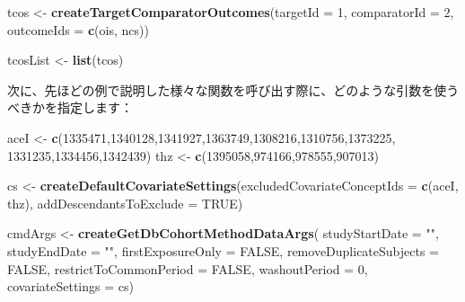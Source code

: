 \documentclass[
  11pt]{book}
\newenvironment{Shaded}{\begin{snugshade}}{\end{snugshade}}
\newcommand{\AttributeTok}[1]{\textcolor[rgb]{0.13,0.29,0.53}{#1}}
\newcommand{\ConstantTok}[1]{\textcolor[rgb]{0.56,0.35,0.01}{#1}}
\newcommand{\DecValTok}[1]{\textcolor[rgb]{0.00,0.00,0.81}{#1}}
\newcommand{\FunctionTok}[1]{\textcolor[rgb]{0.13,0.29,0.53}{\textbf{#1}}}
\newcommand{\NormalTok}[1]{#1}
\newcommand{\OtherTok}[1]{\textcolor[rgb]{0.56,0.35,0.01}{#1}}
\newcommand{\StringTok}[1]{\textcolor[rgb]{0.31,0.60,0.02}{#1}}
\theoremstyle{definition}
\theoremstyle{definition}
\theoremstyle{definition}
\theoremstyle{definition}
\theoremstyle{remark}
\begin{document}
\begin{Shaded}
\begin{Highlighting}[]
\NormalTok{tcos }\OtherTok{\textless{}{-}} \FunctionTok{createTargetComparatorOutcomes}\NormalTok{(}\AttributeTok{targetId =} \DecValTok{1}\NormalTok{,}
                                       \AttributeTok{comparatorId =} \DecValTok{2}\NormalTok{,}
                                       \AttributeTok{outcomeIds =} \FunctionTok{c}\NormalTok{(ois, ncs))}

\NormalTok{tcosList }\OtherTok{\textless{}{-}} \FunctionTok{list}\NormalTok{(tcos)}
\end{Highlighting}
\end{Shaded}

次に、先ほどの例で説明した様々な関数を呼び出す際に、どのような引数を使うべきかを指定します：

\begin{Shaded}
\begin{Highlighting}[]
\NormalTok{aceI }\OtherTok{\textless{}{-}} \FunctionTok{c}\NormalTok{(}\DecValTok{1335471}\NormalTok{,}\DecValTok{1340128}\NormalTok{,}\DecValTok{1341927}\NormalTok{,}\DecValTok{1363749}\NormalTok{,}\DecValTok{1308216}\NormalTok{,}\DecValTok{1310756}\NormalTok{,}\DecValTok{1373225}\NormalTok{,}
          \DecValTok{1331235}\NormalTok{,}\DecValTok{1334456}\NormalTok{,}\DecValTok{1342439}\NormalTok{)}
\NormalTok{thz }\OtherTok{\textless{}{-}} \FunctionTok{c}\NormalTok{(}\DecValTok{1395058}\NormalTok{,}\DecValTok{974166}\NormalTok{,}\DecValTok{978555}\NormalTok{,}\DecValTok{907013}\NormalTok{)}

\NormalTok{cs }\OtherTok{\textless{}{-}} \FunctionTok{createDefaultCovariateSettings}\NormalTok{(}\AttributeTok{excludedCovariateConceptIds =} \FunctionTok{c}\NormalTok{(aceI,}
\NormalTok{                                                                     thz),}
                                     \AttributeTok{addDescendantsToExclude =} \ConstantTok{TRUE}\NormalTok{)}

\NormalTok{cmdArgs }\OtherTok{\textless{}{-}} \FunctionTok{createGetDbCohortMethodDataArgs}\NormalTok{(}
  \AttributeTok{studyStartDate =} \StringTok{""}\NormalTok{,}
  \AttributeTok{studyEndDate =} \StringTok{""}\NormalTok{,}
  \AttributeTok{firstExposureOnly =} \ConstantTok{FALSE}\NormalTok{,}
  \AttributeTok{removeDuplicateSubjects =} \ConstantTok{FALSE}\NormalTok{,}
  \AttributeTok{restrictToCommonPeriod =} \ConstantTok{FALSE}\NormalTok{,}
  \AttributeTok{washoutPeriod =} \DecValTok{0}\NormalTok{,}
  \AttributeTok{covariateSettings =}\NormalTok{ cs)}


\end{Highlighting}
\end{Shaded}
\end{document}
